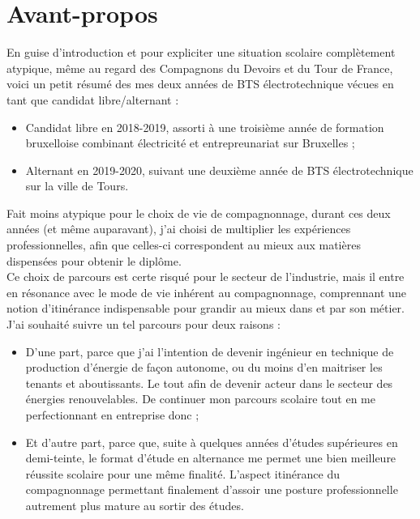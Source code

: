 \documentclass[a4paper, 12pt]{article}
\begin{document}
{\hypersetup{hidelinks}
\renewcommand{\contentsname}{Sommaire}
\tableofcontents }

\newpage

\part{Avant-propos}

En guise d'introduction et pour expliciter une situation scolaire complètement atypique, même au regard des Compagnons du Devoirs et du Tour de France, voici un petit résumé des mes deux années de BTS électrotechnique vécues en tant que candidat libre/alternant :
\begin{itemize}
\item Candidat libre en 2018-2019, assorti à une troisième année de formation bruxelloise combinant électricité et entrepreunariat sur Bruxelles ;
\item Alternant en 2019-2020, suivant une deuxième année de BTS électrotechnique sur la ville de Tours.\\
\end{itemize}

Fait moins atypique pour le choix de vie de compagnonnage, durant ces deux années (et même auparavant), j'ai choisi de multiplier les expériences professionnelles, afin que celles-ci correspondent au mieux aux matières dispensées pour obtenir le diplôme.\\ Ce choix de parcours est certe risqué pour le secteur de l'industrie, mais il entre en résonance avec le mode de vie inhérent au compagnonnage, comprennant une notion d'itinérance indispensable pour grandir au mieux dans et par son métier.\\

J'ai souhaité suivre un tel parcours pour deux raisons :
\begin{itemize}
\item D'une part, parce que j'ai l'intention de devenir ingénieur en technique de production d'énergie de façon autonome, ou du moins d'en maitriser les tenants et aboutissants. Le tout afin de devenir acteur dans le secteur des énergies renouvelables. De continuer mon parcours scolaire tout en me perfectionnant en entreprise donc ;
\item Et d'autre part, parce que, suite à quelques années d'études supérieures en demi-teinte, le format d'étude en alternance me permet une bien meilleure réussite scolaire pour une même finalité. L'aspect itinérance du compagnonnage permettant finalement d'assoir une posture professionnelle autrement plus mature au sortir des études.\\
\end{itemize}
\end{document}
